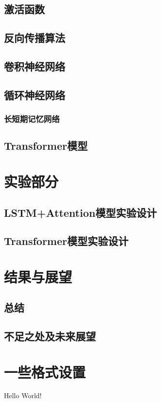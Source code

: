 \documentclass[12pt]{article} %
\begin{document}
		\subsection{激活函数}
		\subsection{反向传播算法}
		\subsection{卷积神经网络}
		\subsection{循环神经网络}
			\subsubsection{长短期记忆网络}
		\subsection{Transformer模型}
	\section{实验部分}
		\subsection{LSTM+Attention模型实验设计}
		\subsection{Transformer模型实验设计}
	\section{结果与展望}
		\subsection{总结}
		\subsection{不足之处及未来展望}
	
	
	\section{一些格式设置}
	\maketitle
	Hello World!
	
\end{document}
